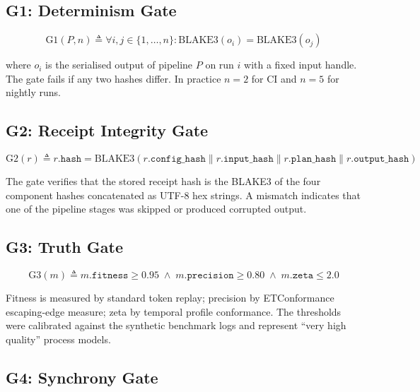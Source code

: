 \documentclass[11pt,a4paper]{article}
\begin{document}
\subsection{G1: Determinism Gate}

\begin{equation}
  \text{G1}(P, n) \triangleq \forall i,j \in \{1,\ldots,n\} \colon
    \text{BLAKE3}(o_i) = \text{BLAKE3}(o_j)
\end{equation}

where $o_i$ is the serialised output of pipeline $P$ on run $i$ with a
fixed input handle. The gate fails if any two hashes differ. In practice
$n = 2$ for CI and $n = 5$ for nightly runs.

\subsection{G2: Receipt Integrity Gate}

\begin{equation}
  \text{G2}(r) \triangleq
    r.\texttt{hash} = \text{BLAKE3}(r.\texttt{config\_hash} \| r.\texttt{input\_hash}
                              \| r.\texttt{plan\_hash} \| r.\texttt{output\_hash})
\end{equation}

The gate verifies that the stored receipt hash is the BLAKE3 of the four
component hashes concatenated as UTF-8 hex strings. A mismatch indicates
that one of the pipeline stages was skipped or produced corrupted output.

\subsection{G3: Truth Gate}

\begin{equation}
  \text{G3}(m) \triangleq m.\texttt{fitness} \geq 0.95 \;\land\;
                            m.\texttt{precision} \geq 0.80 \;\land\;
                            m.\texttt{zeta} \leq 2.0
\end{equation}

Fitness is measured by standard token replay; precision by
ETConformance escaping-edge measure; zeta by temporal profile
conformance. The thresholds were calibrated against the synthetic
benchmark logs and represent ``very high quality'' process models.

\subsection{G4: Synchrony Gate}
\end{document}
